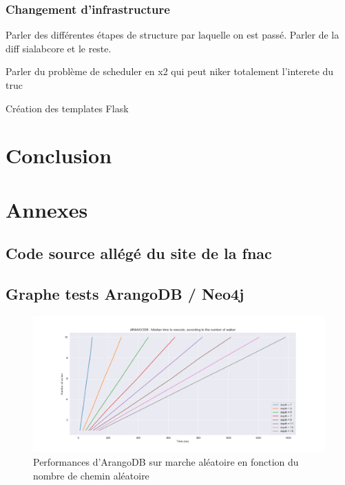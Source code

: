 \documentclass{article} %
\begin{document}
 
\subsubsection{Changement d'infrastructure}



Parler des différentes étapes de structure par laquelle on est passé. Parler de la diff sialabcore et le reste.

Parler du problème de scheduler en x2 qui peut niker totalement l'interete du truc

Création des templates Flask 



\newpage


\section{Conclusion}
\newpage

\section{Annexes}
\subsection{Code source allégé du site de la fnac}
%
\subsection{Graphe tests ArangoDB / Neo4j}

\begin{figure}[!h]
	\centering
	\includegraphics[keepaspectratio = true,scale=0.4]{arangoDB_nbwalker_time.png}
	\caption{Performances d'ArangoDB sur marche aléatoire en fonction du nombre de chemin aléatoire}
	\label{fig:arwalk}
\end{figure}
\end{document}

